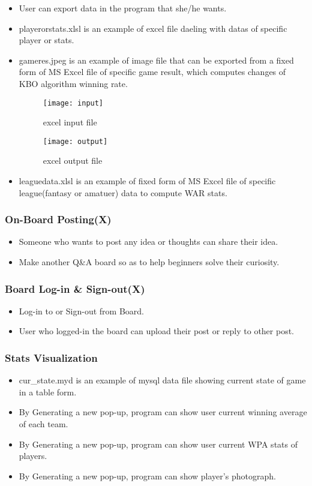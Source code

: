 \documentclass[conference,compsoc, twocolumn]{IEEEtran}
\begin{document}
\begin{itemize}
\item User can export data in the program that she/he wants.
\item playerorstats.xlsl is an example of excel file daeling with datas of specific player or stats.
\item gameres.jpeg is an example of image file that can be exported from a fixed form of MS Excel file of specific game result, which computes changes of KBO 
algorithm winning rate.

\begin{figure}[H]
\centering\texttt{[image: input]}
\caption{excel input file}
\end{figure}

\begin{figure}[H]
\centering\texttt{[image: output]}
\caption{excel output file}
\end{figure}
\item leaguedata.xlsl is an example of fixed form of MS Excel file of specific league(fantasy or amatuer) data to compute WAR stats.
\end{itemize}

\subsubsection{On-Board Posting(X)}
\begin{itemize}
\item Someone who wants to post any idea or thoughts can share their idea.
\item Make another Q&A board so as to help beginners solve their curiosity.
\end{itemize}

\subsubsection{Board Log-in \& Sign-out(X)}
\begin{itemize}
\item Log-in to or Sign-out from Board.
\item User who logged-in the board can upload their post or reply to other post.
\end{itemize}

\subsubsection{Stats Visualization}
\begin{itemize}
\item cur\_state.myd is an example of mysql data file showing current state of game in a table form.
\item By Generating a new pop-up, program can show user current winning average of each team.
\item By Generating a new pop-up, program can show user current WPA stats of players.
\item By Generating a new pop-up, program can show player's photograph.
\end{itemize}
\end{document}
